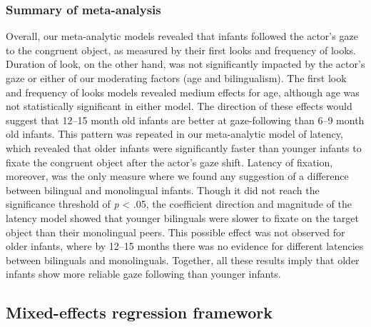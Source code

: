 \documentclass[,man,floatsintext]{apa6}
\begin{document}
\hypertarget{summary-of-meta-analysis}{%
\subsubsection{Summary of meta-analysis}\label{summary-of-meta-analysis}}

Overall, our meta-analytic models revealed that infants followed the actor's gaze to the congruent object, as measured by their first looks and frequency of looks. Duration of look, on the other hand, was not significantly impacted by the actor's gaze or either of our moderating factors (age and bilingualism). The first look and frequency of looks models revealed medium effects for age, although age was not statistically significant in either model. The direction of these effects would suggest that 12--15 month old infants are better at gaze-following than 6--9 month old infants. This pattern was repeated in our meta-analytic model of latency, which revealed that older infants were significantly faster than younger infants to fixate the congruent object after the actor's gaze shift. Latency of fixation, moreover, was the only measure where we found any suggestion of a difference between bilingual and monolingual infants. Though it did not reach the significance threshold of \emph{p} \textless{} .05, the coefficient direction and magnitude of the latency model showed that younger bilinguals were slower to fixate on the target object than their monolingual peers. This possible effect was not observed for older infants, where by 12--15 months there was no evidence for different latencies between bilinguals and monolinguals. Together, all these results imply that older infants show more reliable gaze following than younger infants.

\hypertarget{mixed-effects-regression-framework}{%
\subsection{Mixed-effects regression framework}\label{mixed-effects-regression-framework}}
\end{document}
